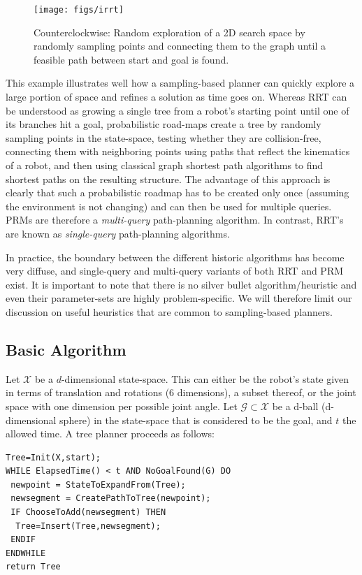 \begin{figure}
\centering
\texttt{[image: figs/irrt]}
\caption{Counterclockwise: Random exploration of a 2D search space by randomly sampling points and connecting them to the graph until a feasible path between start and goal is found.\label{fig:rrt}}
\end{figure}

This example illustrates well how a sampling-based planner can quickly explore a large portion of space and refines a solution as time goes on. Whereas RRT can be understood as growing a single tree from a robot's starting point until one of its branches hit a goal, probabilistic road-maps create a tree by randomly sampling points in the state-space, testing whether they are collision-free, connecting them with neighboring points using paths that reflect the kinematics of a robot, and then using classical graph shortest path algorithms to find shortest paths on the resulting structure. The advantage of this approach is clearly that such a probabilistic roadmap has to be created only once (assuming the environment is not changing) and can then be used for multiple queries. PRMs are therefore a \emph{multi-query} path-planning algorithm. In contrast, RRT's are known as \emph{single-query} path-planning algorithms.

In practice, the boundary between the different historic algorithms has become very diffuse, and single-query and multi-query variants of both RRT and PRM exist. It is important to note that there is no silver bullet algorithm/heuristic and even their parameter-sets are highly problem-specific. We will therefore limit our discussion on useful heuristics that are common to sampling-based planners.

\subsection{Basic Algorithm}
Let $ \mathcal{X}$ be a $ d$-dimensional state-space. This can either be the robot's state given in terms of translation and rotations (6 dimensions), a subset thereof, or the joint space with one dimension per possible joint angle. Let $ \mathcal{G} \subset \mathcal{X}$ be a  d-ball (d-dimensional sphere) in the state-space that is considered to be the goal, and $ t$ the allowed time. A tree planner proceeds as follows:

\begin{verbatim}
Tree=Init(X,start);
WHILE ElapsedTime() < t AND NoGoalFound(G) DO
 newpoint = StateToExpandFrom(Tree);
 newsegment = CreatePathToTree(newpoint);
 IF ChooseToAdd(newsegment) THEN
  Tree=Insert(Tree,newsegment);
 ENDIF
ENDWHILE
return Tree
\end{verbatim}

